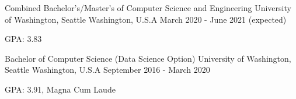 

\begin{cventries}

  \cventry
    {Combined Bachelor's/Master's of Computer Science and Engineering} %
    {University of Washington, Seattle} %
    {Washington, U.S.A} %
    {March 2020 - June 2021 (expected)} %
    {
      \begin{cvitems} %
        \item {GPA: 3.83}
      \end{cvitems}
    }

  \cventry
    {Bachelor of Computer Science (Data Science Option)} %
    {University of Washington, Seattle} %
    {Washington, U.S.A} %
    {September 2016 - March 2020} %
    {
      \begin{cvitems} %
        \item {GPA: 3.91, Magna Cum Laude}
      \end{cvitems}
    }

\end{cventries}
